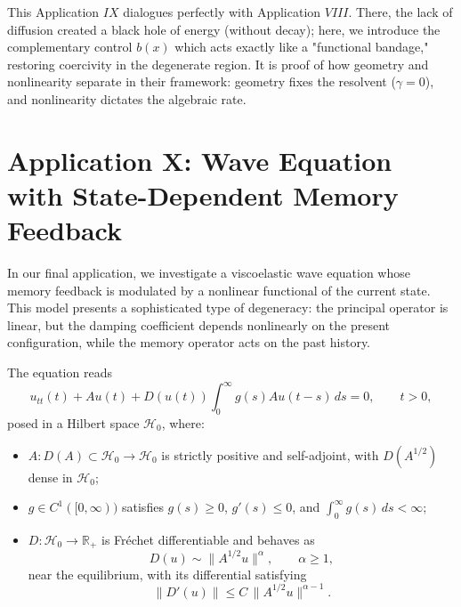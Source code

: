 \documentclass[11pt,reqno]{amsart}
\theoremstyle{remark}
\begin{document}
\bigskip
This Application $IX$ dialogues perfectly with Application $VIII$. There, the lack of diffusion created a black hole of energy (without decay); here, we introduce the complementary control $b(x)$ which acts exactly like a "functional bandage," restoring coercivity in the degenerate region. It is proof of how geometry and nonlinearity separate in their framework: geometry fixes the resolvent ($\gamma=0$), and nonlinearity dictates the algebraic rate.
\bigskip




\section{Application X: Wave Equation with State-Dependent Memory Feedback}
\label{sec:nonlinear_memory}

In our final application, we investigate a viscoelastic wave equation whose memory feedback is modulated by a nonlinear functional of the current state. This model presents a sophisticated type of degeneracy: the principal operator is linear, but the damping coefficient depends nonlinearly on the present configuration, while the memory operator acts on the past history.

The equation reads
\begin{equation}
u_{tt}(t) + Au(t) + D(u(t))\int_0^\infty g(s)Au(t-s)\,ds = 0, \qquad t>0,
\label{X-model}
\end{equation}
posed in a Hilbert space $\mathcal{H}_0$, where:
\begin{itemize}
    \item $A:D(A)\subset \mathcal{H}_0 \to \mathcal{H}_0$ is strictly positive and self-adjoint, with $D(A^{1/2})$ dense in $\mathcal{H}_0$;
    \item $g\in C^1([0,\infty))$ satisfies $g(s)\ge 0$, $g'(s)\le 0$, and $\int_0^{\infty}g(s)\,ds<\infty$;
    \item $D:\mathcal{H}_0 \to \mathbb{R}_+$ is Fréchet differentiable and behaves as
          \[
          D(u)\sim \|A^{1/2}u\|^\alpha,\qquad \alpha\ge 1,
          \]
          near the equilibrium, with its differential satisfying
          \begin{equation}
          \|D'(u)\|\le C\, \|A^{1/2}u\|^{\alpha-1}.
          \label{X-Dprime-bnd}
          \end{equation}
\end{itemize}
\end{document}
